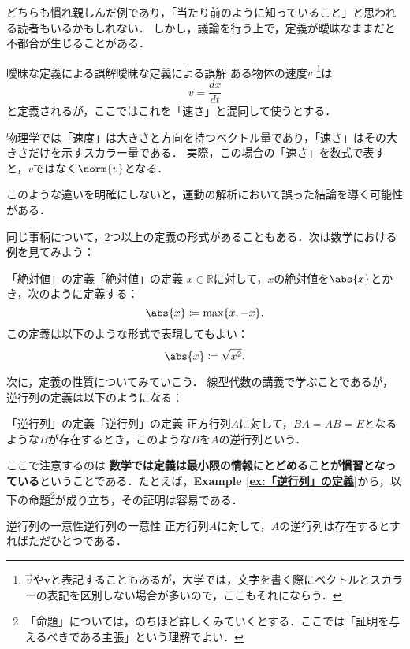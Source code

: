 \documentclass[a4paper,11pt]{ltjsarticle}
\renewcommand{\emph}[1]{\textbf{#1}}
\newcommand{\exref}[1]{{\bfseries\sffamily Example \ref{ex:#1}}}
\begin{document}
どちらも慣れ親しんだ例であり，「当たり前のように知っていること」と思われる読者もいるかもしれない．
しかし，議論を行う上で，定義が曖昧なままだと不都合が生じることがある．

\begin{example}{曖昧な定義による誤解}{曖昧な定義による誤解} 
  ある物体の速度$v$ \footnote{$\vec{v}$や$\bm{v}$と表記することもあるが，大学では，文字を書く際にベクトルとスカラーの表記を区別しない場合が多いので，ここもそれにならう．}は
  \[
  v = \frac{dx}{dt}
  \]
  と定義されるが，ここではこれを「速さ」と混同して使うとする．
  
  物理学では「速度」は大きさと方向を持つベクトル量であり，「速さ」はその大きさだけを示すスカラー量である．
  実際，この場合の「速さ」を数式で表すと，$v$ではなく$\norm{v}$となる．

  このような違いを明確にしないと，運動の解析において誤った結論を導く可能性がある．
\end{example}

同じ事柄について，2つ以上の定義の形式があることもある．次は数学における例を見てみよう：

\begin{example}{「絶対値」の定義}{「絶対値」の定義}
	$ x \in \mathbb{R}$に対して，$x$の絶対値を$\abs{x}$とかき，次のように定義する：
	\[
	\abs{x} \coloneqq \max \{ x , -x \} .
	\]
	この定義は以下のような形式で表現してもよい：
	\[
	\abs{x} \coloneqq  \sqrt{x^2}.
	\]
\end{example}

次に，定義の性質についてみていこう．
線型代数の講義で学ぶことであるが，逆行列の定義は以下のようになる：

\begin{example}{「逆行列」の定義}{「逆行列」の定義}
	正方行列$A$に対して，$BA = AB =E$となるような$B$が存在するとき，このような$B$を$A$の逆行列という．
\end{example}


ここで注意するのは \emph{数学では定義は最小限の情報にとどめることが慣習となっている}ということである．たとえば，\exref{「逆行列」の定義}から，以下の命題\footnote{「命題」については，のちほど詳しくみていくとする．ここでは「証明を与えるべきである主張」という理解でよい．}が成り立ち，その証明は容易である．

\begin{prop}{逆行列の一意性}{逆行列の一意性}
	正方行列$A$に対して，$A$の逆行列は存在するとすればただひとつである．
\end{prop}
\end{document}
